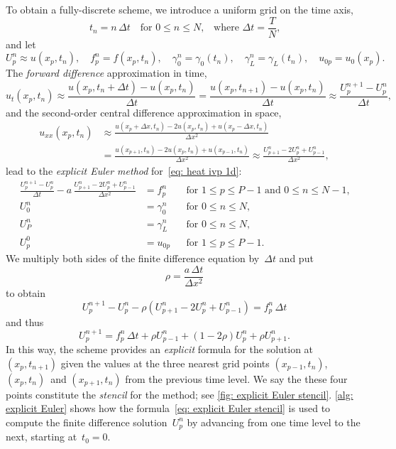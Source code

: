 To obtain a fully-discrete scheme, we introduce a uniform grid on the time axis,
\[
t_n=n\,\Delta t\quad\text{for $0\le n\le N$,}
	\quad\text{where $\Delta t=\frac{T}{N}$,}
\]
and let
\[
U^n_p\approx u(x_p,t_n),\quad
f^n_p=f(x_p,t_n),\quad
\gamma_0^n=\gamma_0(t_n),\quad
\gamma_L^n=\gamma_L(t_n),\quad
u_{0p}=u_0(x_p).
\]
The \emph{forward difference} approximation in time,
\[
u_t(x_p,t_n)\approx\frac{u(x_p,t_n+\Delta t)-u(x_p,t_n)}{\Delta t}
	=\frac{u(x_p,t_{n+1})-u(x_p,t_n)}{\Delta t}
		\approx\frac{U^{n+1}_p-U^n_p}{\Delta t},
\]
and the second-order central difference approximation in space,
\begin{align*}
u_{xx}(x_p,t_n)
&\approx\frac{u(x_p+\Delta x,t_n)-2u(x_p,t_n)+u(x_p-\Delta x,t_n)}{\Delta x^2}\\
&=\frac{u(x_{p+1},t_n)-2u(x_p,t_n)+u(x_{p-1},t_n)}{\Delta x^2}
\approx\frac{U^n_{p+1}-2U^n_p+U^n_{p-1}}{\Delta x^2},
\end{align*}
lead to the \emph{explicit Euler method} for~\eqref{eq: heat ivp 1d}:
\begin{equation}\label{eq: explicit Euler 1d}
\begin{aligned}
\frac{U^{n+1}_p-U^n_p}{\Delta t}
	-a\,\frac{U^n_{p+1}-2U^n_p+U^n_{p-1}}{\Delta x^2}&=f^n_p&
&\text{for $1\le p\le P-1$ and $0\le n\le N-1$,}\\
U^n_0&=\gamma_0^n&&\text{for $0\le n\le N$,}\\
U^n_P&=\gamma_L^n&&\text{for $0\le n\le N$,}\\
U^0_p&=u_{0p}&&\text{for $1\le p\le P-1$.}
\end{aligned}
\end{equation}
We multiply both sides of the finite difference equation by~$\Delta t$ and put
\begin{equation}\label{eq: rho explicit Euler}
\rho=\frac{a\,\Delta t}{\Delta x^2}
\end{equation}
to obtain
\[
U^{n+1}_p-U^n_p-\rho(U^n_{p+1}-2U^n_p+U^n_{p-1})=f^n_p\,\Delta t
\]
and thus
\begin{equation}\label{eq: explicit Euler stencil}
U^{n+1}_p=f^n_p\,\Delta t+\rho U^n_{p-1}+(1-2\rho)U^n_p+\rho U^n_{p+1}.
\end{equation}
In this way, the scheme provides an \emph{explicit} formula for the solution 
at~$(x_p,t_{n+1})$ given the values at the three nearest grid 
points $(x_{p-1},t_n)$, $(x_p,t_n)$~and $(x_{p+1},t_n)$ from the previous time 
level.  We say the these four points constitute the \emph{stencil} for the 
method; see \cref{fig: explicit Euler stencil}.
\cref{alg: explicit Euler} shows how the 
formula~\eqref{eq: explicit Euler stencil} is used to compute the finite 
difference solution~$U^n_p$ by advancing from one time level to the next, 
starting at~$t_0=0$.  


